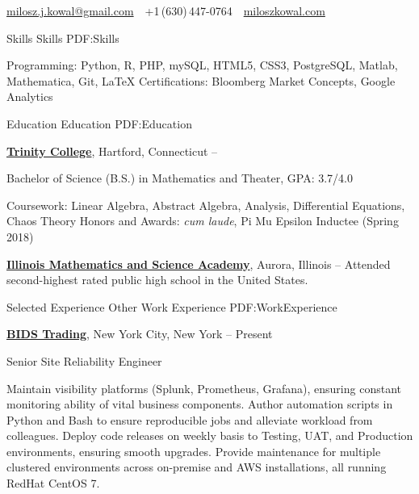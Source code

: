 \documentclass[letterpaper,MMMyyyy,nonstopmode]{simpleresumecv}
\newcommand{\CVAuthor}{Milosz Kowal}
\newcommand{\CVWebpage}{https://miloszkowal.com}
\begin{document}

\Title{\CVAuthor}

\begin{SubTitle}
\par
\href{mailto:milosz.j.kowal@gmail.com}
{milosz.j.kowal@gmail.com}
\,\SubBulletSymbol\,
+1\,(630)\,447-0764
\,\SubBulletSymbol\,
\href{\CVWebpage}
{miloszkowal.com}
\end{SubTitle}

\begin{Body}


\Section
{Skills}
{Skills}
{PDF:Skills}

\Entry
Programming: Python, R, PHP, mySQL, HTML5, CSS3, PostgreSQL, Matlab, Mathematica, Git, \LaTeX{} \hfill\break{}
Certifications: Bloomberg Market Concepts, Google Analytics


\hrulefill
\Section
{Education}
{Education}
{PDF:Education}

\Entry
\href{http://www.trincoll.edu}
{\textbf{Trinity College}},
Hartford, Connecticut
\hfill
{} --

\Gap
\BulletItem
Bachelor of Science (B.S.) in
Mathematics and Theater, GPA: 3.7/4.0
\begin{Detail}
\SubBulletItem
Coursework: Linear Algebra, Abstract Algebra, Analysis, Differential Equations, Chaos Theory
\SubBulletItem
Honors and Awards: \textit{cum laude}, Pi Mu Epsilon Inductee (Spring 2018)
\end{Detail}

\BigGap
\Entry
\href{http://www.imsa.edu}
{\textbf{Illinois Mathematics and Science Academy}},
Aurora, Illinois
\hfill
{} --
\Gap
\BulletItem
Attended second-highest rated public high school in the United States.


\hrulefill
\Section
{Selected\newline
Experience}
{Other Work Experience}
{PDF:WorkExperience}

\Entry
\href{https://www.bidstrading.com/}
{\textbf{BIDS Trading}},
New York City, New York
\hfill
{} --
Present

\Gap
\BulletItem
Senior Site Reliability Engineer
\begin{Detail}
\SubBulletItem
Maintain visibility platforms (Splunk, Prometheus, Grafana), ensuring constant monitoring ability of vital business components.
\SubBulletItem
Author automation scripts in Python and Bash to ensure reproducible jobs and alleviate workload from colleagues. 
\SubBulletItem
Deploy code releases on weekly basis to Testing, UAT, and Production environments, ensuring smooth upgrades.
\SubBulletItem
Provide maintenance for multiple clustered environments across on-premise and AWS installations, all running RedHat CentOS 7.
\end{Detail}


\end{Body}
\end{document}
